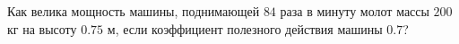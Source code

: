 Как велика мощность машины, поднимающей $84$ раза в минуту молот массы
$200$ кг на высоту $0.75$ м, если коэффициент полезного действия машины
$0.7$?
